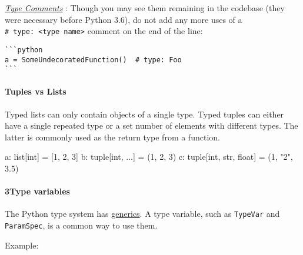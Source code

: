 \documentclass[
]{article}
\newenvironment{Shaded}{}{}
\newcommand{\BuiltInTok}[1]{\textcolor[rgb]{0.00,0.50,0.00}{#1}}
\newcommand{\DecValTok}[1]{\textcolor[rgb]{0.25,0.63,0.44}{#1}}
\newcommand{\FloatTok}[1]{\textcolor[rgb]{0.25,0.63,0.44}{#1}}
\newcommand{\NormalTok}[1]{#1}
\newcommand{\OperatorTok}[1]{\textcolor[rgb]{0.40,0.40,0.40}{#1}}
\newcommand{\StringTok}[1]{\textcolor[rgb]{0.25,0.44,0.63}{#1}}
\begin{document}
\hyperref[type-comments]{\emph{Type Comments}} : Though you may see them
remaining in the codebase (they were necessary before Python 3.6), do
not add any more uses of a
\texttt{\#\ type:\ \textless{}type\ name\textgreater{}} comment on the
end of the line:

\begin{verbatim}
```python
a = SomeUndecoratedFunction()  # type: Foo
```
\end{verbatim}

\paragraph{Tuples vs Lists}

Typed lists can only contain objects of a single type. Typed tuples can
either have a single repeated type or a set number of elements with
different types. The latter is commonly used as the return type from a
function.

\begin{samepage}
\begin{Shaded}
\begin{Highlighting}[]
\NormalTok{a: }\BuiltInTok{list}\NormalTok{[}\BuiltInTok{int}\NormalTok{] }\OperatorTok{=}\NormalTok{ [}\DecValTok{1}\NormalTok{, }\DecValTok{2}\NormalTok{, }\DecValTok{3}\NormalTok{]}
\NormalTok{b: }\BuiltInTok{tuple}\NormalTok{[}\BuiltInTok{int}\NormalTok{, ...] }\OperatorTok{=}\NormalTok{ (}\DecValTok{1}\NormalTok{, }\DecValTok{2}\NormalTok{, }\DecValTok{3}\NormalTok{)}
\NormalTok{c: }\BuiltInTok{tuple}\NormalTok{[}\BuiltInTok{int}\NormalTok{, }\BuiltInTok{str}\NormalTok{, }\BuiltInTok{float}\NormalTok{] }\OperatorTok{=}\NormalTok{ (}\DecValTok{1}\NormalTok{, }\StringTok{"2"}\NormalTok{, }\FloatTok{3.5}\NormalTok{)}
\end{Highlighting}
\end{Shaded}
\end{samepage}

\paragraph{3Type variables}

The Python type system has
\href{https://peps.python.org/pep-0484/\#generics}{generics}. A type
variable, such as \texttt{TypeVar} and \texttt{ParamSpec}, is a common
way to use them.

Example:
\end{document}

